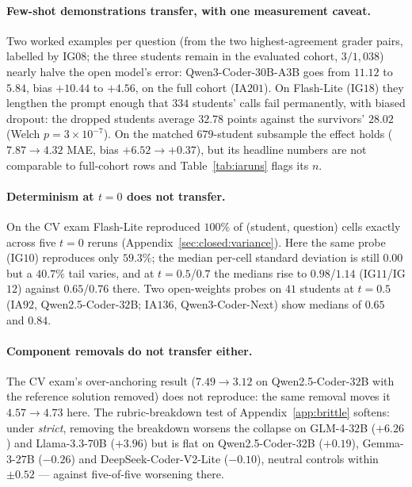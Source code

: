 \paragraph{Few-shot demonstrations transfer, with one measurement caveat.}
Two worked examples per question (from the two highest-agreement grader pairs, labelled by IG$08$; the three students remain in the evaluated cohort, $3/1{,}038$) nearly halve the open model's error: Qwen3-Coder-$30$B-A$3$B goes from $11.12$ to $5.84$, bias $+10.44$ to $+4.56$, on the full cohort (IA$201$). On Flash-Lite (IG$18$) they lengthen the prompt enough that $334$ students' calls fail permanently, with biased dropout: the dropped students average $32.78$ points against the survivors' $28.02$ (Welch $p = 3\times10^{-7}$). On the matched $679$-student subsample the effect holds ($7.87 \to 4.32$ MAE, bias $+6.52 \to +0.37$), but its headline numbers are not comparable to full-cohort rows and Table~\ref{tab:iaruns} flags its $n$.

\paragraph{Determinism at $t = 0$ does not transfer.}
On the CV exam Flash-Lite reproduced $100\%$ of (student, question) cells exactly across five $t = 0$ reruns (Appendix~\ref{sec:closed:variance}). Here the same probe (IG$10$) reproduces only $59.3\%$; the median per-cell standard deviation is still $0.00$ but a $40.7\%$ tail varies, and at $t = 0.5$/$0.7$ the medians rise to $0.98$/$1.14$ (IG$11$/IG$12$) against $0.65$/$0.76$ there. Two open-weights probes on $41$ students at $t = 0.5$ (IA$92$, Qwen2.5-Coder-$32$B; IA$136$, Qwen3-Coder-Next) show medians of $0.65$ and $0.84$.

\paragraph{Component removals do not transfer either.}
The CV exam's over-anchoring result ($7.49 \to 3.12$ on Qwen2.5-Coder-$32$B with the reference solution removed) does not reproduce: the same removal moves it $4.57 \to 4.73$ here. The rubric-breakdown test of Appendix~\ref{app:brittle} softens: under \emph{strict}, removing the breakdown worsens the collapse on GLM-4-$32$B ($+6.26$) and Llama-3.3-$70$B ($+3.96$) but is flat on Qwen2.5-Coder-$32$B ($+0.19$), Gemma-3-$27$B ($-0.26$) and DeepSeek-Coder-V2-Lite ($-0.10$), neutral controls within $\pm 0.52$ --- against five-of-five worsening there.

